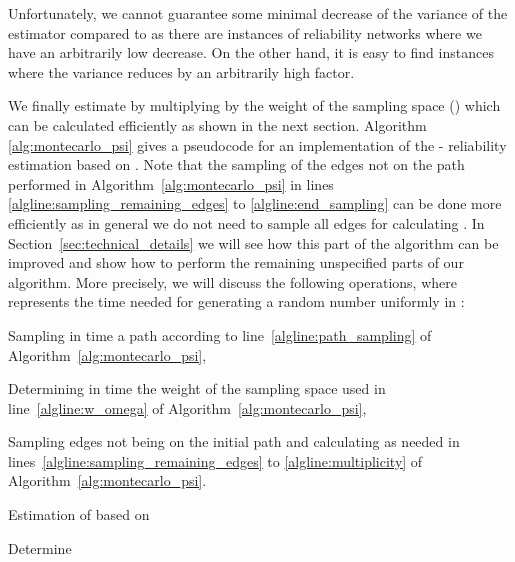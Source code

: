 \documentclass{article}
\begin{document}
Unfortunately, we cannot guarantee some minimal decrease of the variance
of the estimator  compared to  as there are instances
of reliability networks where we have an arbitrarily low decrease.
On the other hand, it is easy to find instances where the variance
reduces by an arbitrarily high factor.

We finally estimate  by multiplying  by
the weight of the sampling space () which can be calculated
efficiently as shown in the next section.  Algorithm \ref{alg:montecarlo_psi}
gives a pseudocode for an implementation of the - reliability
estimation based on .
Note that the sampling of the edges not on the path performed in
Algorithm~\ref{alg:montecarlo_psi} in lines
\ref{algline:sampling_remaining_edges} to \ref{algline:end_sampling} can
be done more efficiently as in general we do not need to sample all edges
for calculating .
In Section~\ref{sec:technical_details} we will see how this part of the algorithm can
be improved and show how to perform the remaining unspecified parts of our algorithm.
More precisely, we will discuss the following operations, where  represents the
time needed for generating a random number uniformly in :
\begin{compactitem}
\item Sampling in  time a path according to line~\ref{algline:path_sampling} of
Algorithm~\ref{alg:montecarlo_psi},
\item Determining in  time the weight  of the sampling space  used in
line~\ref{algline:w_omega} of Algorithm~\ref{alg:montecarlo_psi},
\item Sampling edges not being on the initial path 
and calculating  as needed in
lines~\ref{algline:sampling_remaining_edges} to
\ref{algline:multiplicity} of Algorithm~\ref{alg:montecarlo_psi}.
\end{compactitem}

\linesnumbered
\begin{algorithm}[H]
\SetLine
\caption{Estimation of 
based on \label{alg:montecarlo_psi}}
\;
\;
Determine \label{algline:w_omega}\;
\Return{}
\end{algorithm}
\end{document}
